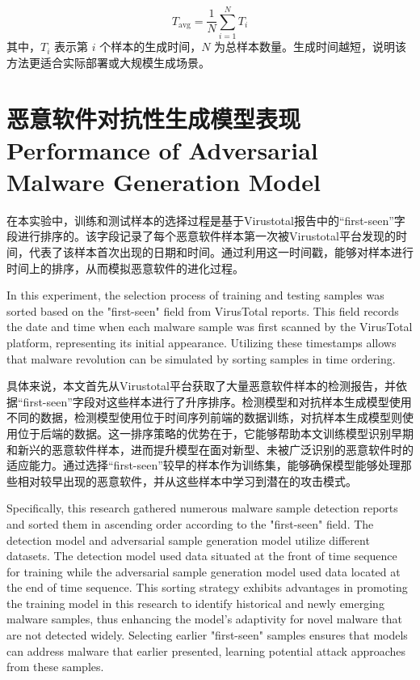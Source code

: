 \begin{enumerate}[label=\arabic*)]
	\begin{equation}
		T_{\text{avg}} = \frac{1}{N} \sum_{i=1}^{N} T_i
		\tag{5.8}
	\end{equation}
	其中，$T_i$ 表示第 $i$ 个样本的生成时间，$N$ 为总样本数量。生成时间越短，说明该方法更适合实际部署或大规模生成场景。

\end{enumerate}

\section{恶意软件对抗性生成模型表现 Performance of Adversarial Malware Generation Model}

在本实验中，训练和测试样本的选择过程是基于Virustotal报告中的“first-seen”字段进行排序的。该字段记录了每个恶意软件样本第一次被Virustotal平台发现的时间，代表了该样本首次出现的日期和时间。通过利用这一时间戳，能够对样本进行时间上的排序，从而模拟恶意软件的进化过程。

In this experiment, the selection process of training and testing samples was sorted based on the "first-seen" field from VirusTotal reports. This field records the date and time when each malware sample was first scanned by the VirusTotal platform, representing its initial appearance. Utilizing these timestamps allows that malware revolution can be simulated by sorting samples in time ordering.

具体来说，本文首先从Virustotal平台获取了大量恶意软件样本的检测报告，并依据“first-seen”字段对这些样本进行了升序排序。检测模型和对抗样本生成模型使用不同的数据，检测模型使用位于时间序列前端的数据训练，对抗样本生成模型则使用位于后端的数据。这一排序策略的优势在于，它能够帮助本文训练模型识别早期和新兴的恶意软件样本，进而提升模型在面对新型、未被广泛识别的恶意软件时的适应能力。通过选择“first-seen”较早的样本作为训练集，能够确保模型能够处理那些相对较早出现的恶意软件，并从这些样本中学习到潜在的攻击模式。

Specifically, this research gathered numerous malware sample detection reports and sorted them in ascending order according to the "first-seen" field. The detection model and adversarial sample generation model utilize different datasets. The detection model used data situated at the front of time sequence for training while the adversarial sample generation model used data located at the end of time sequence. This sorting strategy exhibits advantages in promoting the training model in this research to identify historical and newly emerging malware samples, thus enhancing the model's adaptivity for novel malware that are not detected widely. Selecting earlier "first-seen" samples ensures that models can address malware that earlier presented, learning potential attack approaches from these samples.

